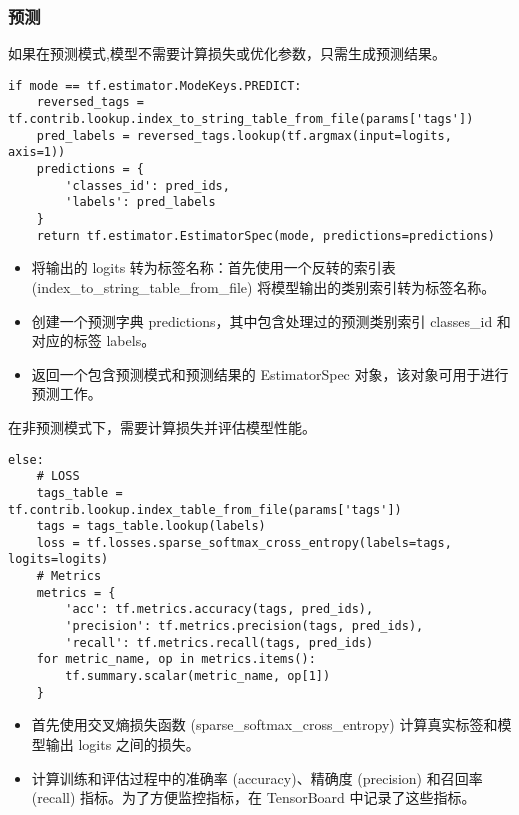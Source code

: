 \subsubsection{预测}

如果在预测模式,模型不需要计算损失或优化参数，只需生成预测结果。

\begin{lstlisting}
if mode == tf.estimator.ModeKeys.PREDICT:
    reversed_tags = tf.contrib.lookup.index_to_string_table_from_file(params['tags'])
    pred_labels = reversed_tags.lookup(tf.argmax(input=logits, axis=1))
    predictions = {
        'classes_id': pred_ids,
        'labels': pred_labels
    }
    return tf.estimator.EstimatorSpec(mode, predictions=predictions)\end{lstlisting}

\begin{itemize}
    \item 将输出的 logits 转为标签名称：首先使用一个反转的索引表 (index\_to\_string\_table\_from\_file) 将模型输出的类别索引转为标签名称。
    \item 创建一个预测字典 predictions，其中包含处理过的预测类别索引 classes\_id 和对应的标签 labels。
    \item 返回一个包含预测模式和预测结果的 EstimatorSpec 对象，该对象可用于进行预测工作。
\end{itemize}

在非预测模式下，需要计算损失并评估模型性能。

\begin{lstlisting}
else:
    # LOSS
    tags_table = tf.contrib.lookup.index_table_from_file(params['tags'])
    tags = tags_table.lookup(labels)
    loss = tf.losses.sparse_softmax_cross_entropy(labels=tags, logits=logits)
    # Metrics
    metrics = {
        'acc': tf.metrics.accuracy(tags, pred_ids),
        'precision': tf.metrics.precision(tags, pred_ids),
        'recall': tf.metrics.recall(tags, pred_ids)
    for metric_name, op in metrics.items():
        tf.summary.scalar(metric_name, op[1])
    }\end{lstlisting}

\begin{itemize}
    \item 首先使用交叉熵损失函数 (sparse\_softmax\_cross\_entropy) 计算真实标签和模型输出 logits 之间的损失。
    \item 计算训练和评估过程中的准确率 (accuracy)、精确度 (precision) 和召回率 (recall) 指标。为了方便监控指标，在 TensorBoard 中记录了这些指标。
\end{itemize}

